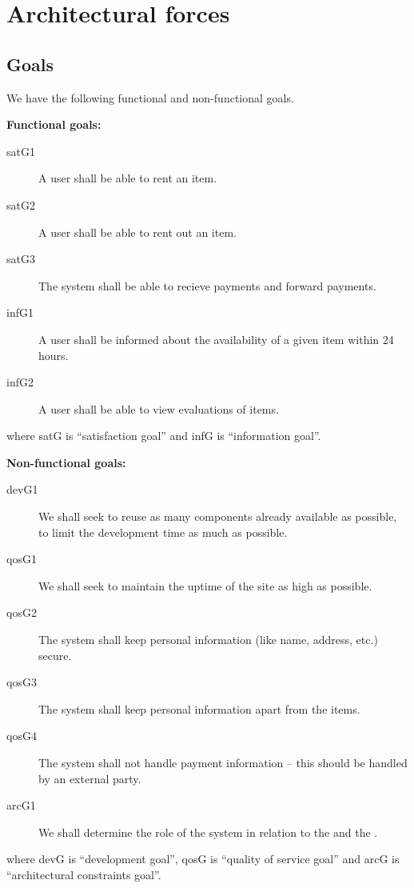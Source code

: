 \chapter{Architectural forces}
\label{cha:architectural-forces}
\thispagestyle{fancy}

\section{Goals}
\label{sec:goals}
We have the following functional and non-functional goals.

\textbf{Functional goals:}
\begin{description}
  \item[satG1] A user shall be able to rent an item.
  \item[satG2] A user shall be able to rent out an item.
  \item[satG3] The system shall be able to recieve payments and forward payments.
  \item[infG1] A user shall be informed about the availability of a given item within 24 hours.
  \item[infG2] A user shall be able to view evaluations of items.
\end{description}
where satG is ``satisfaction goal'' and infG is ``information goal''.

\textbf{Non-functional goals:}
\begin{description}
  \item[devG1] We shall seek to reuse as many components already available as possible, to limit the development time as much as possible.
  \item[qosG1] We shall seek to maintain the uptime of the site as high as possible.
  \item[qosG2] The system shall keep personal information (like name, address, etc.) secure.
  \item[qosG3] The system shall keep personal information apart from the items. %
  \item[qosG4] The system shall not handle payment information --  this should be handled by an external party.
  \item[arcG1] We shall determine the role of the system in relation to the \seller and the \buyer.
\end{description}
where devG is ``development goal'', qosG is ``quality of service goal'' and arcG is ``architectural constraints goal''.


